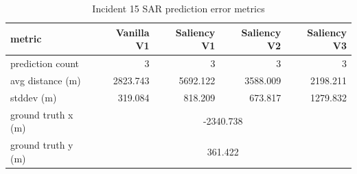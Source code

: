 \begin{table}[ht]
\centering
\caption{Incident 15 SAR prediction error metrics}
\label{tab:sar-incident-15}
\begin{tabular}{lrrrr}
\hline
metric & Vanilla V1 & Saliency V1 & Saliency V2 & Saliency V3 \\
\hline
prediction count & 3 & 3 & 3 & 3 \\
avg distance (m) & 2823.743 & 5692.122 & 3588.009 & 2198.211 \\
stddev (m) & 319.084 & 818.209 & 673.817 & 1279.832 \\
ground truth x (m) & \multicolumn{4}{c}{-2340.738} \\
ground truth y (m) & \multicolumn{4}{c}{361.422} \\
\hline
\end{tabular}
\end{table}
